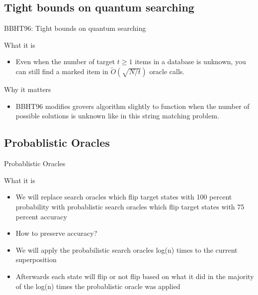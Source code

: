 \documentclass{beamer}
\begin{document}
\subsection{Tight bounds on quantum searching}
\begin{frame}{BBHT96: Tight bounds on quantum searching}
  \begin{block}{What it is}
    \begin{itemize}
      \item Even when the number of target \(t \ge 1\) items in a database is unknown,
            you can still find a marked item in \(\tilde O(\sqrt{N/t})\) oracle calls.

    \end{itemize}
  \end{block}
  \begin{block}{Why it matters}
    \begin{itemize}
      \item BBHT96 modifies grovers algorithm slightly to function when the number of possible solutions is unknown like in this string matching problem.
    \end{itemize}
  \end{block}
\end{frame}


\subsection{Probablistic Oracles}
\begin{frame}{Probablistic Oracles}
  \begin{block}{What it is}
    \begin{itemize}
      \item We will replace search oracles which flip target states with 100 percent probability with probablistic search oracles which flip target states with 75 percent accuracy
      \item How to preserve accuracy?
      \item We will apply the probabilistic search oracles log(n) times to the current superposition
      \item Afterwards each state will flip or not flip based on what it did in the majority of the log(n) times the probablistic oracle was applied
    \end{itemize}
  \end{block}
\end{frame}
\end{document}
